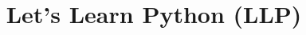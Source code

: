 \documentclass[xcolor=dvipsnames,compress,t,pdf]{beamer}
\title[\insertframenumber /\inserttotalframenumber]{Let's Learn Python (LLP)}
\begin{document}
	\begin{frame}
	\titlepage
	\end{frame}

	
	
\end{document}
